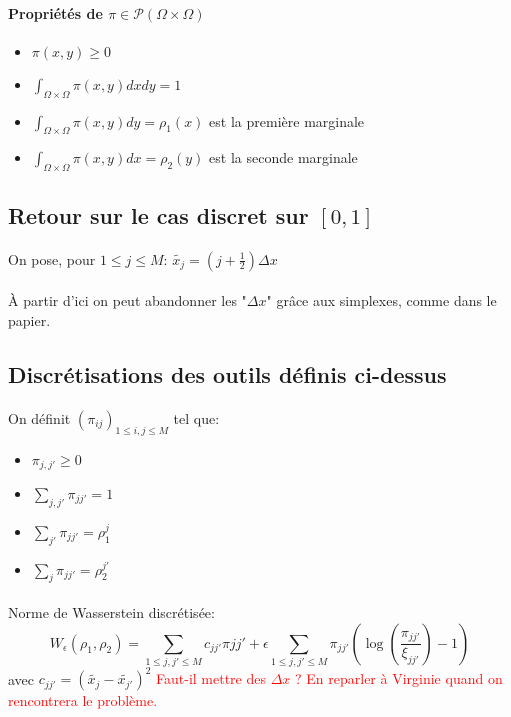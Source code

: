 \documentclass[11pt]{article}
\begin{document}
    
    \paragraph{Propriétés de $\pi \in \mathcal{P}(\Omega \times \Omega )$}
    \begin{itemize}
    \item $\pi(x,y) \geq 0$
    \item $\int_{\Omega \times \Omega} \pi(x,y) dx dy=1$
    \item $\int_{\Omega \times \Omega} \pi(x,y) dy=\rho_1(x)$ est la première marginale
    \item $\int_{\Omega \times \Omega} \pi(x,y) dx =\rho_2(y)$ est la seconde marginale
    \end{itemize}
    
    \subsection{Retour sur le cas discret sur $[0,1]$}
    \paragraph{}
    On pose, pour $1 \leq j \leq M$: $\tilde{x_j}=(j+\frac{1}{2}) \Delta x$
    
    \paragraph{}
    À partir d'ici on peut abandonner les "$\Delta x$" grâce aux simplexes, comme dans le papier.
    
    \subsection{Discrétisations des outils définis ci-dessus}
    \paragraph{}
    On définit $(\pi_{ij})_{1 \leq i,j \leq M}$ tel que:
    \begin{itemize}
    \item $\pi_{j,j'} \geq 0$
    \item $\sum_{j,j'} \pi_{jj'} =1$
    \item $\sum_{j'} \pi_{jj'} = \rho_1^j$
    \item $\sum_j \pi_{jj'} = \rho_2^{j'}$
    \end{itemize}
    
    \paragraph{}
    Norme de Wasserstein discrétisée:
    \begin{equation}
    W_\epsilon(\rho_1, \rho_2) = \sum_{1 \leq j,j' \leq M} c_{jj'} \pi{jj'} + \epsilon \sum_{1 \leq j,j' \leq M} \pi_{jj'} ( \log(\frac{\pi_{jj'}}{\xi_{jj'}})-1)
    \end{equation}
    avec $c_{jj'}=(\tilde{x_j} - \tilde{x_{j'}})^2$ \textcolor{red}{Faut-il mettre des $\Delta x$ ? En reparler à Virginie quand on rencontrera le problème.}
    
\end{document}
